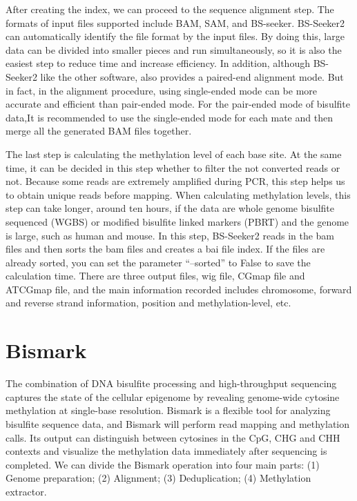 \documentclass{PHlab-thesis}
\begin{document}
After creating the index, we can proceed to the sequence alignment step.  The formats of input files supported include BAM, SAM, and BS-seeker. BS-Seeker2 can automatically identify the file format by the input files. By doing this, large data can be divided into smaller pieces and run simultaneously, so it is also the easiest step to reduce time and increase efficiency. In addition, although BS-Seeker2 like the other software, also provides a paired-end alignment mode. But in fact, in the alignment procedure, using single-ended mode can be more accurate and efficient than pair-ended mode.  For the pair-ended mode of bisulfite data,It is recommended to use the single-ended mode for each mate and then merge all the generated BAM files together.

The last step is calculating the methylation level of each base site. At the same time, it can be decided in this step whether to filter the not converted reads or not. Because some reads are extremely amplified during PCR, this step helps us to obtain unique reads before mapping. When calculating methylation levels, this step can take longer, around ten hours, if the data are whole genome bisulfite sequenced (WGBS) or modified bisulfite linked markers (PBRT) and the genome is large, such as human and mouse. In this step, BS-Seeker2 reads in the bam files and then sorts the bam files and creates a bai file index. If the files are already sorted, you can set the parameter “–sorted” to False to save the calculation time. There are three output files, wig file, CGmap file and ATCGmap file, and the main information recorded includes chromosome, forward and reverse strand information, position and methylation-level, etc.

\section{Bismark}
The combination of DNA bisulfite processing and high-throughput sequencing captures the state of the cellular epigenome by revealing genome-wide cytosine methylation at single-base resolution.  Bismark is a flexible tool for analyzing bisulfite sequence data, and Bismark will perform read mapping and methylation calls\cite{krueger2011bismark}. Its output can distinguish between cytosines in the CpG, CHG and CHH contexts and visualize the methylation data immediately after sequencing is completed.  We can divide the Bismark operation into four main parts: (1) Genome preparation; (2) Alignment; (3) Deduplication; (4) Methylation extractor.
\end{document}
